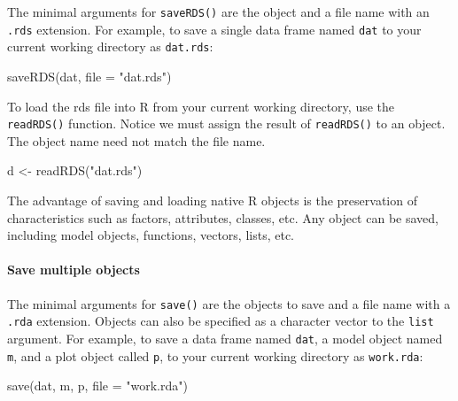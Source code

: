 \documentclass[
]{book}
\newenvironment{Shaded}{\begin{snugshade}}{\end{snugshade}}
\newcommand{\AttributeTok}[1]{\textcolor[rgb]{0.77,0.63,0.00}{#1}}
\newcommand{\FunctionTok}[1]{\textcolor[rgb]{0.00,0.00,0.00}{#1}}
\newcommand{\NormalTok}[1]{#1}
\newcommand{\OtherTok}[1]{\textcolor[rgb]{0.56,0.35,0.01}{#1}}
\newcommand{\StringTok}[1]{\textcolor[rgb]{0.31,0.60,0.02}{#1}}
\begin{document}
The minimal arguments for \texttt{saveRDS()} are the object and a file name with an \texttt{.rds} extension. For example, to save a single data frame named \texttt{dat} to your current working directory as \texttt{dat.rds}:

\begin{Shaded}
\begin{Highlighting}[]
\FunctionTok{saveRDS}\NormalTok{(dat, }\AttributeTok{file =} \StringTok{"dat.rds"}\NormalTok{)}
\end{Highlighting}
\end{Shaded}

To load the rds file into R from your current working directory, use the \texttt{readRDS()} function. Notice we must assign the result of \texttt{readRDS()} to an object. The object name need not match the file name.

\begin{Shaded}
\begin{Highlighting}[]
\NormalTok{d }\OtherTok{\textless{}{-}} \FunctionTok{readRDS}\NormalTok{(}\StringTok{"dat.rds"}\NormalTok{)}
\end{Highlighting}
\end{Shaded}

The advantage of saving and loading native R objects is the preservation of characteristics such as factors, attributes, classes, etc. Any object can be saved, including model objects, functions, vectors, lists, etc.

\hypertarget{save-multiple-objects}{%
\paragraph*{Save multiple objects}\label{save-multiple-objects}}

The minimal arguments for \texttt{save()} are the objects to save and a file name with a \texttt{.rda} extension. Objects can also be specified as a character vector to the \texttt{list} argument. For example, to save a data frame named \texttt{dat}, a model object named \texttt{m}, and a plot object called \texttt{p}, to your current working directory as \texttt{work.rda}:

\begin{Shaded}
\begin{Highlighting}[]
\FunctionTok{save}\NormalTok{(dat, m, p, }\AttributeTok{file =} \StringTok{"work.rda"}\NormalTok{)}
\end{Highlighting}
\end{Shaded}
\end{document}
